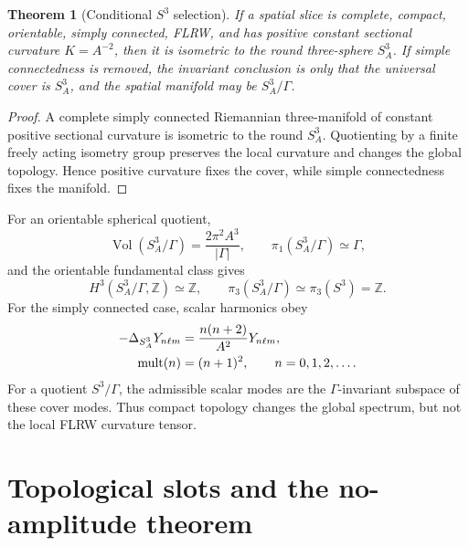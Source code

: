 \documentclass[
  aps,
  prd,
  reprint,
  superscriptaddress,
  floatfix,
  nofootinbib,
  longbibliography
]{revtex4-2}
\theoremstyle{plain}
\newtheorem{theorem}{Theorem}
\theoremstyle{definition}
\theoremstyle{remark}
\newcommand{\Vol}{\operatorname{Vol}}
\newcommand{\Z}{\mathbb Z}
\begin{document}
\begin{theorem}[Conditional \(S^3\) selection]
If a spatial slice is complete, compact, orientable, simply connected, FLRW, and has positive constant sectional curvature \(K=A^{-2}\), then it is isometric to the round three-sphere \(S^3_A\).  If simple connectedness is removed, the invariant conclusion is only that the universal cover is \(S^3_A\), and the spatial manifold may be \(S^3_A/\Gamma\).
\end{theorem}

\begin{proof}
A complete simply connected Riemannian three-manifold of constant positive sectional curvature is isometric to the round \(S^3_A\).  Quotienting by a finite freely acting isometry group preserves the local curvature and changes the global topology.  Hence positive curvature fixes the cover, while simple connectedness fixes the manifold.
\end{proof}

For an orientable spherical quotient,
\begin{equation}
\Vol(S^3_A/\Gamma)=\frac{2\pi^2A^3}{|\Gamma|},
\qquad
\pi_1(S^3_A/\Gamma)\simeq \Gamma ,
\label{eq:quotient_invariants_1}
\end{equation}
and the orientable fundamental class gives
\begin{equation}
H^3(S^3_A/\Gamma,\Z)\simeq \Z,
\qquad
\pi_3(S^3_A/\Gamma)\simeq \pi_3(S^3)=\Z .
\label{eq:quotient_invariants_2}
\end{equation}
For the simply connected case, scalar harmonics obey
\begin{align}
-\Delta_{S^3_A}Y_{n\ell m}
&=
\frac{n(n+2)}{A^2}Y_{n\ell m},
\label{eq:s3_scalar_spectrum}\\
{\rm mult}(n)&=(n+1)^2,\qquad n=0,1,2,\ldots .
\nonumber
\end{align}
For a quotient \(S^3/\Gamma\), the admissible scalar modes are the \(\Gamma\)-invariant subspace of these cover modes.  Thus compact topology changes the global spectrum, but not the local FLRW curvature tensor.

\section{Topological slots and the no-amplitude theorem}
\end{document}
